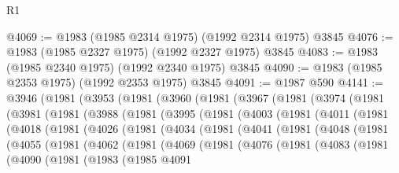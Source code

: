 \begin{lexlean}{R1}
\begin{coremodule}
@4069 := @1983 (@1985 @2314 @1975) (@1992 @2314 @1975) @3845
@4076 := @1983 (@1985 @2327 @1975) (@1992 @2327 @1975) @3845
@4083 := @1983 (@1985 @2340 @1975) (@1992 @2340 @1975) @3845
@4090 := @1983 (@1985 @2353 @1975) (@1992 @2353 @1975) @3845
@4091 := @1987 @590
@4141 := @3946
    (@1981
      (@3953
        (@1981
          (@3960
            (@1981
              (@3967
                (@1981
                  (@3974
                    (@1981
                      (@3981
                        (@1981
                          (@3988
                            (@1981
                              (@3995
                                (@1981
                                  (@4003
                                    (@1981
                                      (@4011
                                        (@1981
                                          (@4018
                                            (@1981
                                              (@4026
                                                (@1981
                                                  (@4034
                                                    (@1981
                                                      (@4041
                                                        (@1981
                                                          (@4048
                                                            (@1981
                                                              (@4055
                                                                (@1981
                                                                  (@4062
                                                                    (@1981
                                                                      (@4069
                                                                        (@1981
                                                                          (@4076
                                                                            (@1981
                                                                              (@4083
                                                                                (@1981
                                                                                  (@4090
                                                                                    (@1981
                                                                                      (@1983
                                                                                        (@1985
                                                                                          @4091

\end{coremodule}
\end{lexlean}
